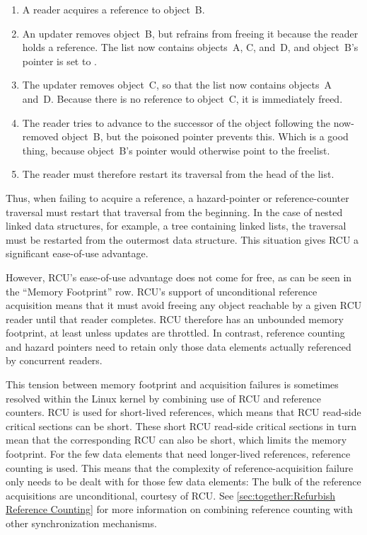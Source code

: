 \begin{enumerate}
\item	A reader acquires a reference to object~B.
\item	An updater removes object~B, but refrains from freeing it because
	the reader holds a reference.
	The list now contains objects~A, C, and~D, and
	object~B's  pointer is set to .
\item	The updater removes object~C, so that the list now contains
	objects~A and~D\@.
	Because there is no reference to object~C, it is immediately freed.
\item	The reader tries to advance to the successor of the object
	following the now-removed object~B, but the poisoned
	 pointer prevents this.
	Which is a good thing, because object~B's  pointer
	would otherwise point to the freelist.
\item	The reader must therefore restart its traversal from the head
	of the list.
\end{enumerate}

Thus, when failing to acquire a reference, a hazard-pointer or
reference-counter traversal must restart that traversal from the
beginning.
In the case of nested linked data structures, for example, a
tree containing linked lists, the traversal must be restarted from
the outermost data structure.
This situation gives RCU a significant ease-of-use advantage.

However, RCU's ease-of-use advantage does not come
for free, as can be seen in the ``Memory Footprint'' row.
RCU's support of unconditional reference acquisition means that
it must avoid freeing any object reachable by a given
RCU reader until that reader completes.
RCU therefore has an unbounded memory footprint, at least unless updates
are throttled.
In contrast, reference counting and hazard pointers need to retain only
those data elements actually referenced by concurrent readers.

This tension between memory footprint and acquisition
failures is sometimes resolved within the Linux kernel by combining use
of RCU and reference counters.
RCU is used for short-lived references, which means that RCU read-side
critical sections can be short.
These short RCU read-side critical sections in turn mean that the corresponding
RCU  can also be short, which limits the memory footprint.
For the few data elements that need longer-lived references, reference
counting is used.
This means that the complexity of reference-acquisition failure only
needs to be dealt with for those few data elements:
The bulk of the reference acquisitions are unconditional, courtesy of RCU\@.
See \cref{sec:together:Refurbish Reference Counting}
for more information on combining reference counting with other
synchronization mechanisms.

